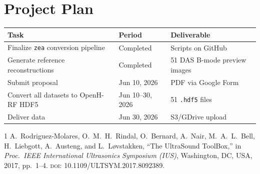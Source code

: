 \documentclass[11pt,a4paper]{article}
\begin{document}
\section{Project Plan}

\begin{table}[h!]
\centering
\small
\begin{tabular}{@{}p{5.5cm}p{3.2cm}p{4.5cm}@{}}
\toprule
\textbf{Task} & \textbf{Period} & \textbf{Deliverable} \\
\midrule
Finalize \texttt{zea} conversion pipeline & Completed & Scripts on GitHub \\
Generate reference reconstructions   & Completed & 51 DAS B-mode preview images \\
Submit proposal                      & Jun 10, 2026 & PDF via Google Form \\
Convert all datasets to OpenH-RF HDF5 & Jun 10--30, 2026 & 51 \texttt{.hdf5} files \\
Deliver data                          & Jun 30, 2026 & S3/GDrive upload \\
\bottomrule
\end{tabular}
\end{table}

\begin{thebibliography}{1}
A.~Rodriguez-Molares, O.~M.~H.~Rindal, O.~Bernard, A.~Nair, M.~A.~L.~Bell, H.~Liebgott, A.~Austeng, and L.~L{\o}vstakken,
``The UltraSound ToolBox,''
in \emph{Proc.\ IEEE International Ultrasonics Symposium (IUS)}, Washington, DC, USA, 2017, pp.~1--4.
\textsc{doi}: 10.1109/ULTSYM.2017.8092389.
\end{thebibliography}
\end{document}
